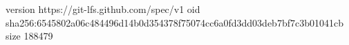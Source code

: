 version https://git-lfs.github.com/spec/v1
oid sha256:6545802a06c484496d14b0d354378f75074cc6a0fd3dd03deb7bf7c3b01041cb
size 188479
